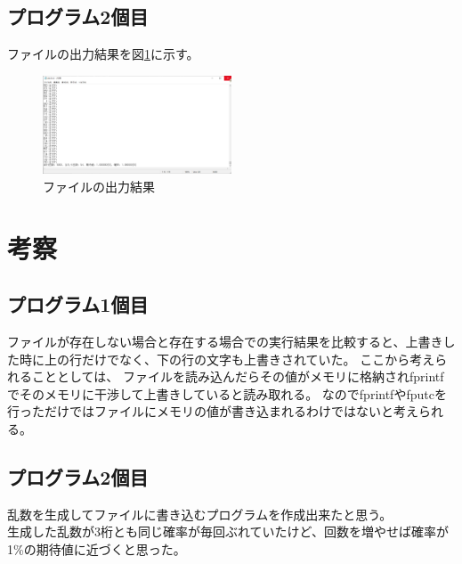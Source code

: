 \documentclass[dvipdfmx]{jsarticle}
\begin{document}
\newpage
\subsection{プログラム2個目}
ファイルの出力結果を図\ref{fig:result_pr2}に示す。\\

\begin{figure}[ht]
  \centering
  \includegraphics[width=0.5\textwidth]{./img/result_pr2.png}
  \caption{ファイルの出力結果}
  \label{fig:result_pr2}
\end{figure}





\section{考察}
\subsection{プログラム1個目}
ファイルが存在しない場合と存在する場合での実行結果を比較すると、上書きした時に上の行だけでなく、下の行の文字も上書きされていた。
ここから考えられることとしては、
ファイルを読み込んだらその値がメモリに格納されfprintfでそのメモリに干渉して上書きしていると読み取れる。
なのでfprintfやfputcを行っただけではファイルにメモリの値が書き込まれるわけではないと考えられる。
\subsection{プログラム2個目}
乱数を生成してファイルに書き込むプログラムを作成出来たと思う。\\
生成した乱数が3桁とも同じ確率が毎回ぶれていたけど、回数を増やせば確率が1\%の期待値に近づくと思った。
\end{document}
